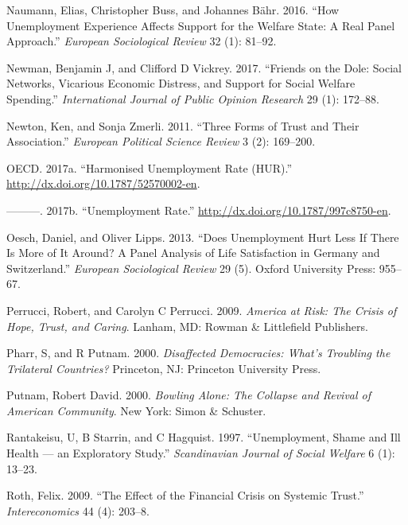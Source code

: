 \documentclass[12pt,]{article}
\begin{document}
\leavevmode\hypertarget{ref-Naumann2016-yh}{}%
Naumann, Elias, Christopher Buss, and Johannes Bähr. 2016. ``How Unemployment Experience Affects Support for the Welfare State: A Real Panel Approach.'' \emph{European Sociological Review} 32 (1): 81--92.

\leavevmode\hypertarget{ref-Newman2017-ls}{}%
Newman, Benjamin J, and Clifford D Vickrey. 2017. ``Friends on the Dole: Social Networks, Vicarious Economic Distress, and Support for Social Welfare Spending.'' \emph{International Journal of Public Opinion Research} 29 (1): 172--88.

\leavevmode\hypertarget{ref-Newton2011-ix}{}%
Newton, Ken, and Sonja Zmerli. 2011. ``Three Forms of Trust and Their Association.'' \emph{European Political Science Review} 3 (2): 169--200.

\leavevmode\hypertarget{ref-Oecd2017-pq}{}%
OECD. 2017a. ``Harmonised Unemployment Rate (HUR).'' \url{http://dx.doi.org/10.1787/52570002-en}.

\leavevmode\hypertarget{ref-Oecd2017-lj}{}%
---------. 2017b. ``Unemployment Rate.'' \url{http://dx.doi.org/10.1787/997c8750-en}.

\leavevmode\hypertarget{ref-Oesch2013-za}{}%
Oesch, Daniel, and Oliver Lipps. 2013. ``Does Unemployment Hurt Less If There Is More of It Around? A Panel Analysis of Life Satisfaction in Germany and Switzerland.'' \emph{European Sociological Review} 29 (5). Oxford University Press: 955--67.

\leavevmode\hypertarget{ref-Perrucci2009-yq}{}%
Perrucci, Robert, and Carolyn C Perrucci. 2009. \emph{America at Risk: The Crisis of Hope, Trust, and Caring}. Lanham, MD: Rowman \& Littlefield Publishers.

\leavevmode\hypertarget{ref-Pharr2000-qy}{}%
Pharr, S, and R Putnam. 2000. \emph{Disaffected Democracies: What's Troubling the Trilateral Countries?} Princeton, NJ: Princeton University Press.

\leavevmode\hypertarget{ref-Putnam2000-ea}{}%
Putnam, Robert David. 2000. \emph{Bowling Alone: The Collapse and Revival of American Community}. New York: Simon \& Schuster.

\leavevmode\hypertarget{ref-Rantakeisu1997-lb}{}%
Rantakeisu, U, B Starrin, and C Hagquist. 1997. ``Unemployment, Shame and Ill Health --- an Exploratory Study.'' \emph{Scandinavian Journal of Social Welfare} 6 (1): 13--23.

\leavevmode\hypertarget{ref-Roth2009-jh}{}%
Roth, Felix. 2009. ``The Effect of the Financial Crisis on Systemic Trust.'' \emph{Intereconomics} 44 (4): 203--8.
\end{document}
